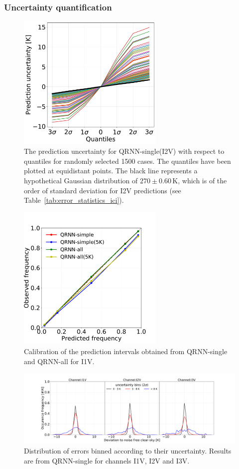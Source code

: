 \documentclass[amt, manuscript]{copernicus}
\begin{document}
\subsubsection{Uncertainty quantification}
\label{sec:prediction_uncertainty}
\begin{figure}[t]
	\includegraphics[width = 70mm]{Figures/prediction_uncertainty_I2V.pdf}	
	\caption{The prediction uncertainty  for QRNN-single(I2V) with respect to quantiles for randomly selected 1500 cases. The quantiles have been plotted at equidistant points. The black line represents a hypothetical Gaussian distribution of $270\pm0.60$\,K, which is of the order of standard deviation for I2V predictions (see Table~\ref{tab:error_statistics_ici}).}
	\label{fig:prediction_uncertainty_I2V}	
\end{figure}
\begin{figure}[t]
	\includegraphics[height = 70mm]{Figures/calibration_QRNN_I1V.pdf}	
	\caption{Calibration of the prediction intervals obtained from QRNN-single and QRNN-all for I1V. }
	\label{fig:calibration_I1V}	
\end{figure}
\begin{figure}[t]
	\includegraphics[width=\textwidth]{Figures/PDF_uncertainty_bins_QRNN-single.pdf}	
	\caption{Distribution of errors binned according to their uncertainty. Results are from QRNN-single for channels I1V, I2V and I3V.}
	\label{fig:error_distribution_uncertainty_bins}	
\end{figure}
\end{document}
